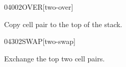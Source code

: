 \vspace*{-1ex}
\begin{worddef}{0400}{2OVER}[two-over]
\item {}

	Copy cell pair  to the top of the stack.

	\begin{testing} %
	\end{testing}
\end{worddef}


\begin{worddef}{0430}{2SWAP}[two-swap]
\item {}

	Exchange the top two cell pairs.

	\begin{testing} %
	\end{testing}
\end{worddef}

